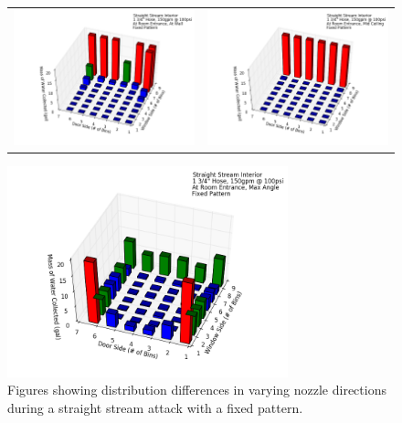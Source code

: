 \documentclass{article}
\begin{document}
\clearpage


\begin{figure}[ht]
\begin{tabular*}{\textwidth}{lr}
\includegraphics[width=3.2in]{../ADD_Analysis/Figures/15-12-09_151401_Datafile_Straight_Stream_Interior.png} &
\includegraphics[width=3.2in]{../ADD_Analysis/Figures/15-12-09_112850_Datafile_Straight_Stream_Interior.png} \\
\end{tabular*}
\centering
\includegraphics[width=3.2in]{../ADD_Analysis/Figures/15-12-09_152435_Datafile_Straight_Stream_Interior.png}
\caption{Figures showing distribution differences in varying nozzle directions during a straight stream attack with a fixed pattern.}
\label{fig:Interior_Varying_Nozzle_Direction_SS_Fixed_Pattern}
\end{figure}
\end{document}

